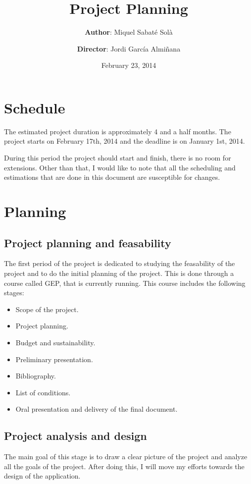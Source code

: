 \documentclass[a4paper,12pt]{article}
\title{\bf Project Planning}
\author{
  {\bf Author}: Miquel Sabaté Solà
  \and
  {\bf Director}: Jordi García Almiñana
}
\date{February 23, 2014}
\newcommand{\mylist}{
\begin{itemize}
\setlength{\itemsep}{1pt}
\setlength{\parskip}{0pt}
\setlength{\parsep}{0pt}}
\newcommand{\mylistend}{\end{itemize}}
\begin{document}
\clearpage\maketitle

\setcounter{page}{1}
\section*{Schedule}

The estimated project duration is approximately 4 and a half months. The
project starts on February 17th, 2014 and the deadline is on January 1st, 2014.

During this period the project should start and finish, there is no room for
extensions. Other than that, I would like to note that all the scheduling and
estimations that are done in this document are susceptible for changes.

\section*{Planning}

\subsection*{Project planning and feasability}

The first period of the project is dedicated to studying the feasability of the
project and to do the initial planning of the project. This is done through a
course called GEP, that is currently running. This course includes the
following stages:

\mylist
  \item Scope of the project.
  \item Project planning.
  \item Budget and sustainability.
  \item Preliminary presentation.
  \item Bibliography.
  \item List of conditions.
  \item Oral presentation and delivery of the final document.
\mylistend

\subsection*{Project analysis and design}

The main goal of this stage is to draw a clear picture of the project and
analyze all the goals of the project. After doing this, I will move my efforts
towards the design of the application.
\end{document}
